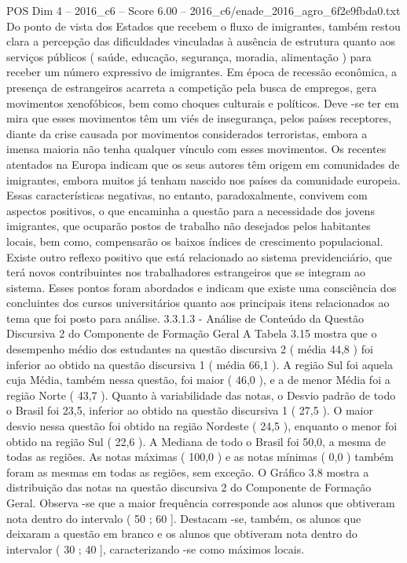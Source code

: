 \begin{textsample}{POS Dim 4 – 2016\_c6 – Score 6.00 – 2016\_c6/enade\_2016\_agro\_6f2e9fbda0.txt}
Do ponto de vista dos Estados que recebem o fluxo de imigrantes, também restou clara a percepção das dificuldades vinculadas à ausência de estrutura quanto aos serviços públicos ( saúde, educação, segurança, moradia, alimentação ) para receber um número expressivo de imigrantes.
Em época de recessão econômica, a presença de estrangeiros acarreta a competição pela busca de empregos, gera movimentos xenofóbicos, bem como choques culturais e políticos.
Deve -se ter em mira que esses movimentos têm um viés de insegurança, pelos países receptores, diante da crise causada por movimentos considerados terroristas, embora a imensa maioria não tenha qualquer vínculo com esses movimentos.
Os recentes atentados na Europa indicam que os seus autores têm origem em comunidades de imigrantes, embora muitos já tenham nascido nos países da comunidade europeia.
Essas características negativas, no entanto, paradoxalmente, convivem com aspectos positivos, o que encaminha a questão para a necessidade dos jovens imigrantes, que ocuparão postos de trabalho não desejados pelos habitantes locais, bem como, compensarão os baixos índices de crescimento populacional.
Existe outro reflexo positivo que está relacionado ao sistema previdenciário, que terá novos contribuintes nos trabalhadores estrangeiros que se integram ao sistema.
Esses pontos foram abordados e indicam que existe uma consciência dos concluintes dos cursos universitários quanto aos principais itens relacionados ao tema que foi posto para análise. 3.3.1.3 - Análise de Conteúdo da Questão Discursiva 2 do Componente de Formação Geral A Tabela 3.15 mostra que o desempenho médio dos estudantes na questão discursiva 2 ( média 44,8 ) foi inferior ao obtido na questão discursiva 1 ( média 66,1 ).
A região Sul foi aquela cuja Média, também nessa questão, foi maior ( 46,0 ), e a de menor Média foi a região Norte ( 43,7 ).
Quanto à variabilidade das notas, o Desvio padrão de todo o Brasil foi 23,5, inferior ao obtido na questão discursiva 1 ( 27,5 ).
O maior desvio nessa questão foi obtido na região Nordeste ( 24,5 ), enquanto o menor foi obtido na região Sul ( 22,6 ).
A Mediana de todo o Brasil foi 50,0, a mesma de todas as regiões.
As notas máximas ( 100,0 ) e as notas mínimas ( 0,0 ) também foram as mesmas em todas as regiões, sem exceção.
O Gráfico 3.8 mostra a distribuição das notas na questão discursiva 2 do Componente de Formação Geral.
Observa -se que a maior frequência corresponde aos alunos que obtiveram nota dentro do intervalo ( 50 ; 60 ].
Destacam -se, também, os alunos que deixaram a questão em branco e os alunos que obtiveram nota dentro do intervalor ( 30 ; 40 ], caracterizando -se como máximos locais.

\end{textsample}
